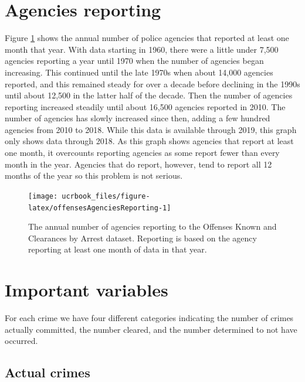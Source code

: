 \documentclass[
  12pt,
  openany]{book}
\begin{document}
\hypertarget{agencies-reporting}{%
\section{Agencies reporting}\label{agencies-reporting}}

Figure \ref{fig:offensesAgenciesReporting} shows the annual number of police agencies that reported at least one month that year. With data starting in 1960, there were a little under 7,500 agencies reporting a year until 1970 when the number of agencies began increasing. This continued until the late 1970s when about 14,000 agencies reported, and this remained steady for over a decade before declining in the 1990s until about 12,500 in the latter half of the decade. Then the number of agencies reporting increased steadily until about 16,500 agencies reported in 2010. The number of agencies has slowly increased since then, adding a few hundred agencies from 2010 to 2018. While this data is available through 2019, this graph only shows data through 2018. As this graph shows agencies that report at least one month, it overcounts reporting agencies as some report fewer than every month in the year. Agencies that do report, however, tend to report all 12 months of the year so this problem is not serious.

\begin{figure}

{\centering \texttt{[image: ucrbook\_files/figure-latex/offensesAgenciesReporting-1]} 

}

\caption{The annual number of agencies reporting to the Offenses Known and Clearances by Arrest dataset. Reporting is based on the agency reporting at least one month of data in that year.}\label{fig:offensesAgenciesReporting}
\end{figure}

\hypertarget{important-variables}{%
\section{Important variables}\label{important-variables}}

For each crime we have four different categories indicating the number of crimes actually committed, the number cleared, and the number determined to not have occurred.

\hypertarget{actual}{%
\subsection{Actual crimes}\label{actual}}
\end{document}
